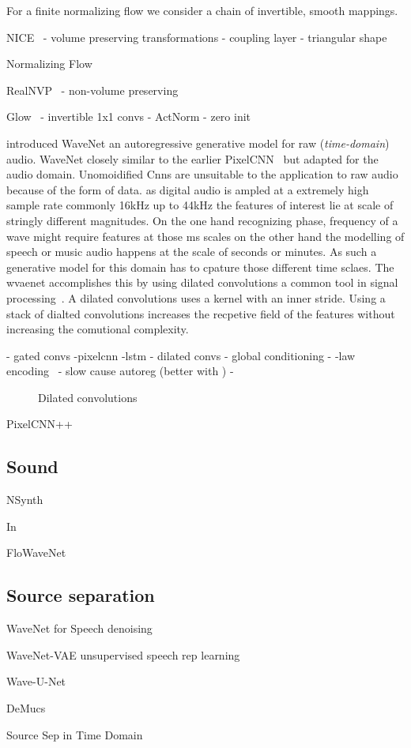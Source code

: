 For a finite normalizing flow we consider a chain of invertible, smooth mappings.

NICE~\autocite{dinhNICE2015}
- volume preserving transformations
- coupling layer
- triangular shape

Normalizing Flow~\autocite{rezendeVariational2016}


RealNVP~\autocite{dinhDensity2017}
- non-volume preserving

Glow~\autocite{kingmaGlow2018}
- invertible 1x1 convs
- ActNorm
- zero init


\autocite{vandenoordWaveNet2016} introduced WaveNet an autoregressive generative model for raw (\textit{time-domain}) audio. WaveNet closely similar to the earlier PixelCNN~\autocite{vandenoordConditional2016} but adapted for the audio domain. Unomoidified Cnns are unsuitable to the application to raw audio because of the form of data. as digital audio is ampled at a extremely high sample rate commonly 16kHz up to 44kHz the features of interest lie at scale of stringly different magnitudes. On the one hand recognizing phase, frequency of a wave might require features at those ms scales on the other hand the modelling of speech or music audio happens at the scale of seconds or minutes. As such a generative model for this domain has to cpature those different time sclaes. The wvaenet accomplishes this by using dilated convolutions a common tool in signal processing~\autocite{dutilleuxImplementation1990}. A dilated convolutions uses a kernel with an inner stride. Using a stack of dialted convolutions increases the recpetive field of the features without increasing the comutional complexity.

- gated convs -pixelcnn -lstm\autocite{hochreiterLong1997a}
- dilated convs
- global conditioning
- \μ-law encoding~\autocite{Recommendation1988}
- slow cause autoreg (better with \autocite{paineFast2016})
-

\begin{figure}[]
    
    \caption{Dilated convolutions}
    \label{fig:wavenet}
\end{figure}

PixelCNN++~\autocite{salimansPixelCNN2017}


\subsection{Sound}
NSynth~\autocite{kalchbrennerEfficient2018}

In~\autocite{prengerWaveGlow2018}

FloWaveNet~\autocite{kimFloWaveNet2019a}

\subsection{Source separation}
WaveNet for Speech denoising\autocite{rethageWavenet2018}

WaveNet-VAE unsupervised speech rep learning\autocite{chorowskiUnsupervised2019}

Wave-U-Net\autocite{stollerWaveUNet2018}

DeMucs\autocite{defossezDemucs2019}

Source Sep in Time Domain\autocite{lluisEndtoend2019}
